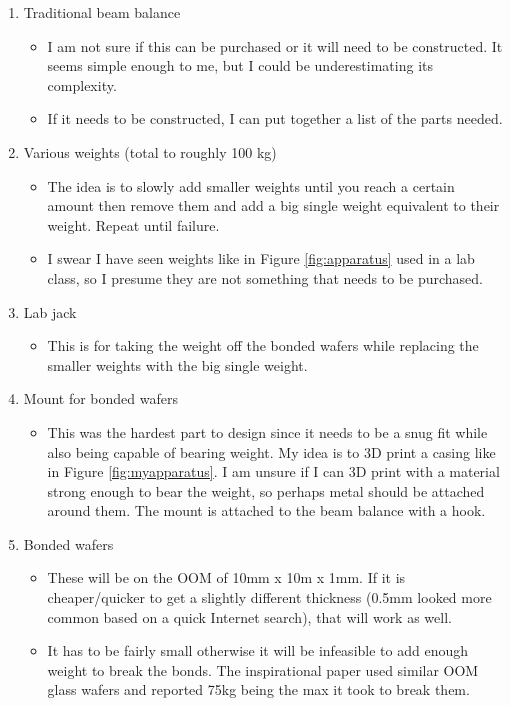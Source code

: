 \documentclass[colorlinks=true,pdfstartview=FitV,linkcolor=blue,
            citecolor=red,urlcolor=magenta]{ligodoc}
\begin{document}
\begin{appendices}
\begin{enumerate}
  \item Traditional beam balance
    \begin{itemize}
    \item I am not sure if this can be purchased or it will need to be constructed. It seems simple enough to me, but I could be underestimating its complexity.
    \item If it needs to be constructed, I can put together a list of the parts needed.
    \end{itemize}
  \item Various weights (total to roughly 100 kg)
    \begin{itemize}
    \item The idea is to slowly add smaller weights until you reach a certain amount then remove them and add a big single weight equivalent to their weight. Repeat until failure.
    \item I swear I have seen weights like in Figure \ref{fig:apparatus} used in a lab class, so I presume they are not something that needs to be purchased.
    \end{itemize}
  \item Lab jack
    \begin{itemize}
    \item This is for taking the weight off the bonded wafers while replacing the smaller weights with the big single weight.
    \end{itemize}
  \item Mount for bonded wafers
    \begin{itemize}
    \item This was the hardest part to design since it needs to be a snug fit while also being capable of bearing weight. My idea is to 3D print a casing like in Figure \ref{fig:myapparatus}. I am unsure if I can 3D print with a material strong enough to bear the weight, so perhaps metal should be attached around them. The mount is attached to the beam balance with a hook.
    \end{itemize}
  \item Bonded wafers
    \begin{itemize}
    \item These will be on the OOM of 10mm x 10m x 1mm. If it is cheaper/quicker to get a slightly different thickness (0.5mm looked more common based on a quick Internet search), that will work as well.
    \item It has to be fairly small otherwise it will be infeasible to add enough weight to break the bonds. The inspirational paper used similar OOM glass wafers and reported 75kg being the max it took to break them.
    \end{itemize}
\end{enumerate}


\end{appendices}
\end{document}
